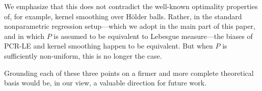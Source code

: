 \begin{itemize}
	We emphasize that this does not contradict the well-known optimality properties of, for example, kernel smoothing over H\"{o}lder balls. Rather, in the standard nonparametric regression setup---which we adopt in the main part of this paper, and in which $P$ is assumed to be equivalent to Lebesgue measure---the biases of PCR-LE and kernel smoothing happen to be equivalent. But when $P$ is sufficiently non-uniform, this is no longer the case.
\end{itemize}
Grounding each of these three points on a firmer and more complete theoretical basis would be, in our view, a valuable direction for future work.